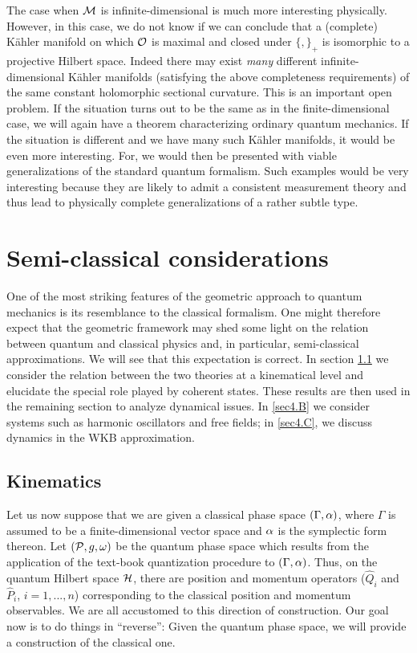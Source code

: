 The case when ${\cal M}$ is infinite-dimensional is much more interesting
physically. However, in this case, we do not know if we can conclude
that a (complete) K\"ahler manifold on which ${\cal O}$ is maximal and
closed under $\{ , \}_+$ is isomorphic to a projective Hilbert space.
Indeed there may exist {\em many} different infinite-dimensional
K\"ahler manifolds (satisfying the above completeness requirements) of
the same constant holomorphic sectional curvature. This is an
important open problem. If the situation turns out to be the same as
in the finite-dimensional case, we will again have a theorem
characterizing ordinary quantum mechanics. If the situation is
different and we have many such K\"ahler manifolds, it would be even
more interesting. For, we would then be presented with viable
generalizations of the standard quantum formalism. Such examples would
be very interesting because they are likely to admit a consistent
measurement theory and thus lead to physically complete
generalizations of a rather subtle type.


\section{Semi-classical considerations} \label{sec4}

One of the most striking features of the geometric approach to quantum
mechanics is its resemblance to the classical formalism. One might
therefore expect that the geometric framework may shed some light on
the relation between quantum and classical physics and, in particular,
semi-classical approximations. We will see that this expectation is
correct. In section \ref{sec4.A} we consider the relation between the
two theories at a kinematical level and elucidate the special role
played by coherent states. These results are then used in the
remaining section to analyze dynamical issues. In \ref{sec4.B} we
consider systems such as harmonic oscillators and free fields; in
\ref{sec4.C}, we discuss dynamics in the WKB approximation.

 
\subsection{Kinematics} \label{sec4.A}

Let us now suppose that we are given a classical phase space $(\Gamma,
\alpha)$, where $\Gamma$ is assumed to be a finite-dimensional vector
space and $\alpha$ is the symplectic form thereon. Let $({\cal P}, g, \omega)$ be
the quantum phase space which results from the application of the
text-book quantization procedure to $(\Gamma, \alpha)$. Thus, on the
quantum Hilbert space ${\cal H}$, there are position and momentum operators
($\hat{Q}_i$ and $\hat{P}_i$, $i=1, ..., n$) corresponding to the
classical position and momentum observables.  We are all accustomed to
this direction of construction. Our goal now is to do things in
``reverse'': Given the quantum phase space, we will provide a
construction of the classical one.

